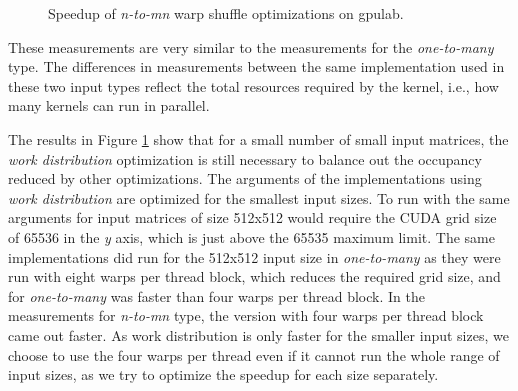 \begin{figure}[ht]
	\centering	
	\begin{subfigure}{0.4\textwidth}
		\centering
		\def\svgwidth{\textwidth}
		
	\end{subfigure}
	\begin{subfigure}{0.4\textwidth}
		\centering
		\def\svgwidth{\textwidth}
		
	\end{subfigure}
	\hfill
	\begin{subfigure}{0.4\textwidth}
		\centering
		\def\svgwidth{\textwidth}
		
	\end{subfigure}
	
	\caption{Speedup of \textit{n-to-mn} warp shuffle optimizations on gpulab.}
	\label{fig:warp_shuffle_n_to_mn_results}
\end{figure}

These measurements are very similar to the measurements for the \textit{one-to-many} type. The differences in measurements between the same implementation used in these two input types reflect the total resources required by the kernel, i.e., how many kernels can run in parallel.


The results in Figure \ref{fig:warp_shuffle_n_to_mn_results} show that for a small number of small input matrices, the \textit{work distribution} optimization is still necessary to balance out the occupancy reduced by other optimizations. The arguments of the implementations using \textit{work distribution} are optimized for the smallest input sizes. To run with the same arguments for input matrices of size 512x512 would require the CUDA grid size of 65536 in the \textit{y} axis, which is just above the 65535 maximum limit. The same implementations did run for the 512x512 input size in \textit{one-to-many} as they were run with eight warps per thread block, which reduces the required grid size, and for \textit{one-to-many} was faster than four warps per thread block. In the measurements for \textit{n-to-mn} type, the version with four warps per thread block came out faster. 
As work distribution is only faster for the smaller input sizes, we choose to use the four warps per thread even if it cannot run the whole range of input sizes, as we try to optimize the speedup for each size separately.

